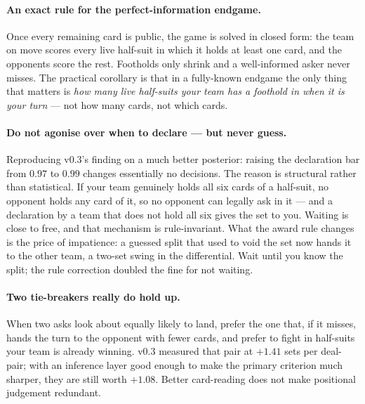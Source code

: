 \documentclass[11pt,a4paper]{article}
\begin{document}
\paragraph{An exact rule for the perfect-information endgame.} Once every
remaining card is public, the game is solved in closed form: the team on move
scores every live half-suit in which it holds at least one card, and the
opponents score the rest. Footholds only shrink and a well-informed asker never
misses. The practical corollary is that in a fully-known endgame the only thing
that matters is \emph{how many live half-suits your team has a foothold in when
it is your turn} --- not how many cards, not which cards.

\paragraph{Do not agonise over when to declare --- but never guess.}
Reproducing v0.3's finding on a much better posterior: raising the
declaration bar from $0.97$ to $0.99$ changes essentially no decisions. The
reason is structural rather than statistical. If your team genuinely holds
all six cards of a half-suit, no opponent holds any card of it, so no
opponent can legally ask in it --- and a declaration by a team that does not
hold all six gives the set to you. Waiting is close to free, and that
mechanism is rule-invariant. What the award rule changes is the price of
impatience: a guessed split that used to void the set now hands it to the
other team, a two-set swing in the differential. Wait until you know the
split; the rule correction doubled the fine for not waiting.

\paragraph{Two tie-breakers really do hold up.} When two asks look about equally
likely to land, prefer the one that, if it misses, hands the turn to the
opponent with fewer cards, and prefer to fight in half-suits your team is
already winning. v0.3 measured that pair at $+1.41$ sets per deal-pair; with an
inference layer good enough to make the primary criterion much sharper, they are
still worth $+1.08$. Better card-reading does not make positional judgement
redundant.
\end{document}
